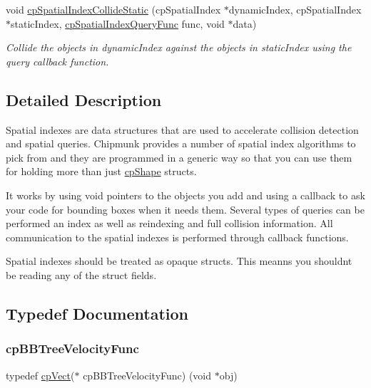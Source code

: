 \begin{DoxyCompactItemize}
\mbox{\label{group__cpSpatialIndex_ga8abb667968f231b2f87c7273d4b0e533}} 
void \hyperlink{group__cpSpatialIndex_ga8abb667968f231b2f87c7273d4b0e533}{cp\+Spatial\+Index\+Collide\+Static} (cp\+Spatial\+Index $\ast$dynamic\+Index, cp\+Spatial\+Index $\ast$static\+Index, \hyperlink{group__cpSpatialIndex_ga7bcf80d017b29d32d9f8011405b241f9}{cp\+Spatial\+Index\+Query\+Func} func, void $\ast$data)
\begin{DoxyCompactList}\small\item\em Collide the objects in {\ttfamily dynamic\+Index} against the objects in {\ttfamily static\+Index} using the query callback function. \end{DoxyCompactList}\end{DoxyCompactItemize}


\subsection{Detailed Description}
Spatial indexes are data structures that are used to accelerate collision detection and spatial queries. Chipmunk provides a number of spatial index algorithms to pick from and they are programmed in a generic way so that you can use them for holding more than just \hyperlink{structcpShape}{cp\+Shape} structs.

It works by using {\ttfamily void} pointers to the objects you add and using a callback to ask your code for bounding boxes when it needs them. Several types of queries can be performed an index as well as reindexing and full collision information. All communication to the spatial indexes is performed through callback functions.

Spatial indexes should be treated as opaque structs. This meanns you shouldn\textquotesingle{}t be reading any of the struct fields. 

\subsection{Typedef Documentation}
\mbox{\label{group__cpSpatialIndex_ga5e805ddbe3cab9b92a6fbd933ff6e6b0}} 
\subsubsection{\texorpdfstring{cp\+B\+B\+Tree\+Velocity\+Func}{cpBBTreeVelocityFunc}\hspace{0.1cm}{\footnotesize\ttfamily [1/2]}}
{\footnotesize\ttfamily typedef \hyperlink{structcpVect}{cp\+Vect}($\ast$ cp\+B\+B\+Tree\+Velocity\+Func) (void $\ast$obj)}

